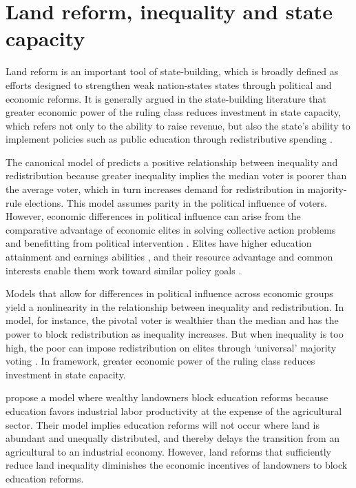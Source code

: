 \section{Land reform, inequality and state capacity}

Land reform is an important tool of state-building, which is broadly defined as efforts designed to strengthen weak nation-states states through political and economic reforms. It is generally argued in the state-building literature that greater economic power of the ruling class reduces investment in state capacity, which refers not only to the ability to raise revenue, but also the state’s ability to implement policies such as public education through redistributive spending \citep{besley2010state}. 

The canonical model of \citet{meltzer1981rational} predicts a positive relationship between inequality and redistribution because greater inequality implies the median voter is poorer than the average voter, which in turn increases demand for redistribution in majority-rule elections. This model assumes parity in the political influence of voters. However, economic differences in political influence can arise from the comparative advantage of economic elites in solving collective action problems and benefitting from political intervention \citep{acemoglu2008persistence}. Elites have higher education attainment and earnings abilities \citep{bourguignon2000oligarchy}, and their resource advantage and common interests enable them work toward similar policy goals \citep{winters2009}. 

Models that allow for differences in political influence across economic groups yield a nonlinearity in the relationship between inequality and redistribution. In  model, for instance, the pivotal voter is wealthier than the median and has the power to block redistribution as inequality increases. But when inequality is too high, the poor can impose redistribution on elites through `universal' majority voting \citep{perotti1993political,saint1993education}. In  framework, greater economic power of the ruling class reduces investment in state capacity. 

\citet{galor2009inequality} propose a model where wealthy landowners block education reforms because education favors industrial labor productivity at the expense of the agricultural sector. Their model implies education reforms will not occur where land is abundant and unequally distributed, and thereby delays the transition from an agricultural to an industrial economy. However, land reforms that sufficiently reduce land inequality diminishes the economic incentives of landowners to block education reforms. 

